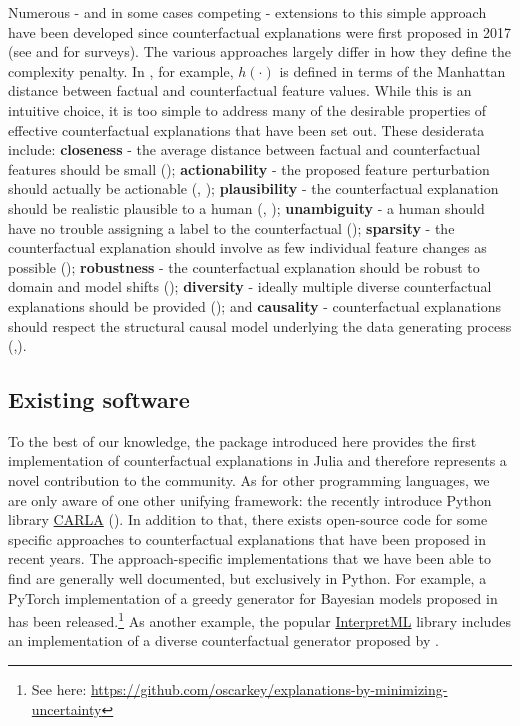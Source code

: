 \documentclass{juliacon}
\begin{document}
Numerous - and in some cases competing - extensions to this simple
approach have been developed since counterfactual explanations were
first proposed in 2017 (see \cite{verma2020counterfactual} and
\cite{karimi2020survey} for surveys). The various approaches largely
differ in how they define the complexity penalty. In
\cite{wachter2017counterfactual}, for example, \(h(\cdot)\) is defined
in terms of the Manhattan distance between factual and counterfactual
feature values. While this is an intuitive choice, it is too simple to
address many of the desirable properties of effective counterfactual
explanations that have been set out. These desiderata include:
\textbf{closeness} - the average distance between factual and
counterfactual features should be small
(\cite{wachter2017counterfactual}); \textbf{actionability} - the
proposed feature perturbation should actually be actionable
(\cite{ustun2019actionable}, \cite{poyiadzi2020face});
\textbf{plausibility} - the counterfactual explanation should be
realistic plausible to a human (\cite{joshi2019realistic},
\cite{schut2021generating}); \textbf{unambiguity} - a human should have
no trouble assigning a label to the counterfactual
(\cite{schut2021generating}); \textbf{sparsity} - the counterfactual
explanation should involve as few individual feature changes as possible
(\cite{schut2021generating}); \textbf{robustness} - the counterfactual
explanation should be robust to domain and model shifts
(\cite{upadhyay2021towards}); \textbf{diversity} - ideally multiple
diverse counterfactual explanations should be provided
(\cite{mothilal2020explaining}); and \textbf{causality} - counterfactual
explanations should respect the structural causal model underlying the
data generating process
(\cite{karimi2020algorithmic},\cite{karimi2021algorithmic}).

\hypertarget{existing-software}{%
\subsection{Existing software}\label{existing-software}}

To the best of our knowledge, the package introduced here provides the
first implementation of counterfactual explanations in Julia and
therefore represents a novel contribution to the community. As for other
programming languages, we are only aware of one other unifying
framework: the recently introduce Python library
\href{https://carla-counterfactual-and-recourse-library.readthedocs.io/en/latest/?badge=latest}{CARLA}
(\cite{pawelczyk2021carla}). In addition to that, there exists
open-source code for some specific approaches to counterfactual
explanations that have been proposed in recent years. The
approach-specific implementations that we have been able to find are
generally well documented, but exclusively in Python. For example, a
PyTorch implementation of a greedy generator for Bayesian models
proposed in \cite{schut2021generating} has been released.\footnote{See
  here:
  \url{https://github.com/oscarkey/explanations-by-minimizing-uncertainty}}
As another example, the popular
\href{https://github.com/interpretml}{InterpretML} library includes an
implementation of a diverse counterfactual generator proposed by
\cite{mothilal2020explaining}.
\end{document}
